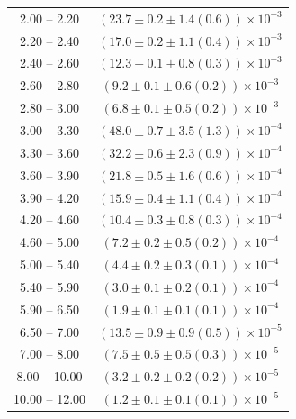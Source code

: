 \begin{table}
\begin{center}
\begin{tabular}{ c | c }
2.00 -- 2.20 & $(23.7\pm0.2\pm1.4(0.6))\times10^{-3}$ \\ 
2.20 -- 2.40 & $(17.0\pm0.2\pm1.1(0.4))\times10^{-3}$ \\ 
2.40 -- 2.60 & $(12.3\pm0.1\pm0.8(0.3))\times10^{-3}$ \\ 
2.60 -- 2.80 & $(9.2\pm0.1\pm0.6(0.2))\times10^{-3}$ \\ 
2.80 -- 3.00 & $(6.8\pm0.1\pm0.5(0.2))\times10^{-3}$ \\ 
3.00 -- 3.30 & $(48.0\pm0.7\pm3.5(1.3))\times10^{-4}$ \\ 
3.30 -- 3.60 & $(32.2\pm0.6\pm2.3(0.9))\times10^{-4}$ \\ 
3.60 -- 3.90 & $(21.8\pm0.5\pm1.6(0.6))\times10^{-4}$ \\ 
3.90 -- 4.20 & $(15.9\pm0.4\pm1.1(0.4))\times10^{-4}$ \\ 
4.20 -- 4.60 & $(10.4\pm0.3\pm0.8(0.3))\times10^{-4}$ \\ 
4.60 -- 5.00 & $(7.2\pm0.2\pm0.5(0.2))\times10^{-4}$ \\ 
5.00 -- 5.40 & $(4.4\pm0.2\pm0.3(0.1))\times10^{-4}$ \\ 
5.40 -- 5.90 & $(3.0\pm0.1\pm0.2(0.1))\times10^{-4}$ \\ 
5.90 -- 6.50 & $(1.9\pm0.1\pm0.1(0.1))\times10^{-4}$ \\ 
6.50 -- 7.00 & $(13.5\pm0.9\pm0.9(0.5))\times10^{-5}$ \\ 
7.00 -- 8.00 & $(7.5\pm0.5\pm0.5(0.3))\times10^{-5}$ \\ 
8.00 -- 10.00 & $(3.2\pm0.2\pm0.2(0.2))\times10^{-5}$ \\ 
10.00 -- 12.00 & $(1.2\pm0.1\pm0.1(0.1))\times10^{-5}$ \\ 
\hline
\end{tabular}
\end{center}
\end{table}
 
